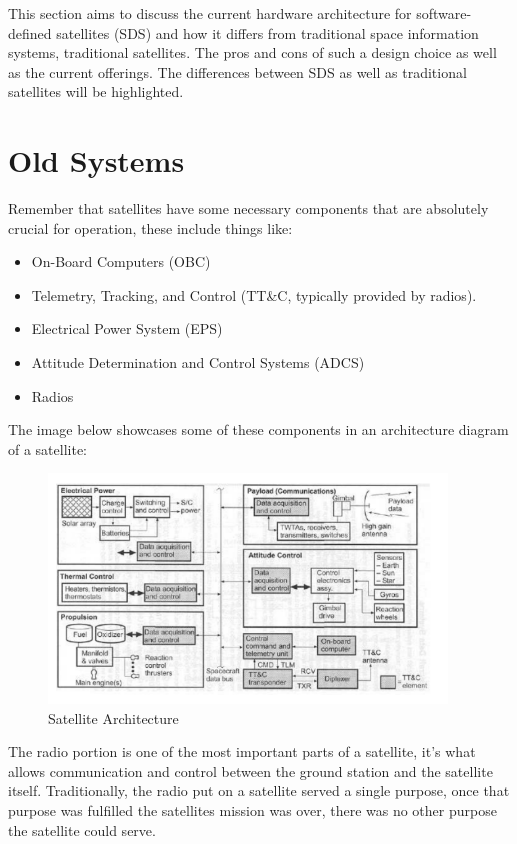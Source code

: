 \documentclass[../main.tex]{subfiles}
\begin{document}
This section aims to discuss the current hardware architecture for software-defined satellites (SDS) and how it differs from traditional space information systems, traditional satellites. The pros and cons of such a design choice as well as the current offerings. The differences between SDS as well as traditional satellites will be highlighted.

\section{Old Systems}
Remember that satellites have some necessary components that are absolutely crucial for operation, these include things like:
\begin{itemize}
    \item On-Board Computers (OBC)
    \item Telemetry, Tracking, and Control (TT\&C, typically provided by radios).
    \item Electrical Power System (EPS)
    \item Attitude Determination and Control Systems (ADCS)
    \item Radios
\end{itemize}
The image below showcases some of these components in an architecture diagram of a satellite:
\begin{figure}[H]
    \centering
    \includegraphics[width=300pt]{images/architecture_satellite.PNG}
    \caption{Satellite Architecture \cite{sat_design}}
    \label{fig:satellite}
\end{figure}
The radio portion is one of the most important parts of a satellite, it's what allows communication and control between the ground station and the satellite itself. Traditionally, the radio put on a satellite served a single purpose, once that purpose was fulfilled the satellites mission was over, there was no other purpose the satellite could serve.
\end{document}
